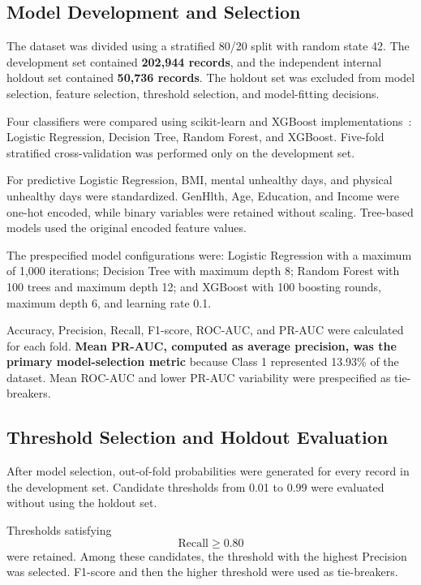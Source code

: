 \documentclass[pdflatex,sn-basic,Numbered]{sn-jnl}
\begin{document}
\subsection{Model Development and Selection}
\label{subsec:ml}

The dataset was divided using a stratified 80/20 split with random state
42.
The development set contained \textbf{202,944 records}, and the independent
internal holdout set contained \textbf{50,736 records}.
The holdout set was excluded from model selection, feature selection,
threshold selection, and model-fitting decisions.

Four classifiers were compared using scikit-learn and XGBoost implementations~\citep{pedregosa2011scikit,chen2016xgboost}:
Logistic Regression, Decision Tree, Random Forest, and XGBoost.
Five-fold stratified cross-validation was performed only on the development
set.

For predictive Logistic Regression, BMI, mental unhealthy days, and
physical unhealthy days were standardized.
GenHlth, Age, Education, and Income were one-hot encoded, while binary
variables were retained without scaling.
Tree-based models used the original encoded feature values.

The prespecified model configurations were:
Logistic Regression with a maximum of 1,000 iterations;
Decision Tree with maximum depth 8;
Random Forest with 100 trees and maximum depth 12; and
XGBoost with 100 boosting rounds, maximum depth 6, and learning rate 0.1.

Accuracy, Precision, Recall, F1-score, ROC-AUC, and PR-AUC were calculated
for each fold.
\textbf{Mean PR-AUC, computed as average precision, was the primary
model-selection metric} because Class 1 represented 13.93\% of the dataset.
Mean ROC-AUC and lower PR-AUC variability were prespecified as tie-breakers.


\subsection{Threshold Selection and Holdout Evaluation}
\label{subsec:threshold}

After model selection, out-of-fold probabilities were generated for every
record in the development set.
Candidate thresholds from 0.01 to 0.99 were evaluated without using the
holdout set.

Thresholds satisfying
\[
\mathrm{Recall} \geq 0.80
\]
were retained.
Among these candidates, the threshold with the highest Precision was
selected.
F1-score and then the higher threshold were used as tie-breakers.
\end{document}
